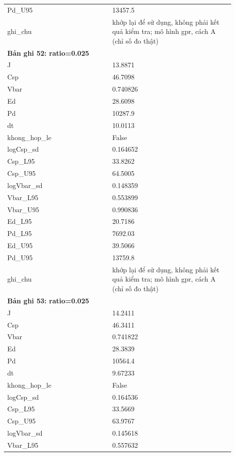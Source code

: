 \begin{longtable}{p{0.43\linewidth}p{0.50\linewidth}}
Pd\_\allowbreak U95 & 13457.5 \\
ghi\_\allowbreak chu & khớp lại để sử dụng, không phải kết quả kiểm tra; mô hình gpr, cách A (chỉ số đo thật) \\
\midrule
\multicolumn{2}{p{0.95\linewidth}}{\textbf{Bản ghi 52: ratio=0.025}} \\
J & 13.8871 \\
Csp & 46.7098 \\
Vbar & 0.740826 \\
Ed & 28.6098 \\
Pd & 10287.9 \\
dt & 10.0113 \\
khong\_\allowbreak hop\_\allowbreak le & False \\
logCsp\_\allowbreak sd & 0.164652 \\
Csp\_\allowbreak L95 & 33.8262 \\
Csp\_\allowbreak U95 & 64.5005 \\
logVbar\_\allowbreak sd & 0.148359 \\
Vbar\_\allowbreak L95 & 0.553899 \\
Vbar\_\allowbreak U95 & 0.990836 \\
Ed\_\allowbreak L95 & 20.7186 \\
Pd\_\allowbreak L95 & 7692.03 \\
Ed\_\allowbreak U95 & 39.5066 \\
Pd\_\allowbreak U95 & 13759.8 \\
ghi\_\allowbreak chu & khớp lại để sử dụng, không phải kết quả kiểm tra; mô hình gpr, cách A (chỉ số đo thật) \\
\midrule
\multicolumn{2}{p{0.95\linewidth}}{\textbf{Bản ghi 53: ratio=0.025}} \\
J & 14.2411 \\
Csp & 46.3411 \\
Vbar & 0.741822 \\
Ed & 28.3839 \\
Pd & 10564.4 \\
dt & 9.67233 \\
khong\_\allowbreak hop\_\allowbreak le & False \\
logCsp\_\allowbreak sd & 0.164536 \\
Csp\_\allowbreak L95 & 33.5669 \\
Csp\_\allowbreak U95 & 63.9767 \\
logVbar\_\allowbreak sd & 0.145618 \\
Vbar\_\allowbreak L95 & 0.557632 \\

\end{longtable}
